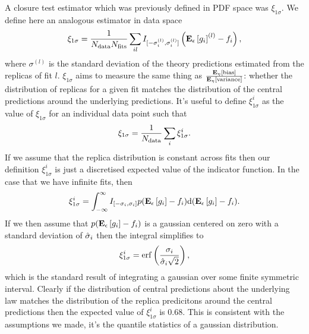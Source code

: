 A closure test estimator which was previously defined in PDF space was $\xi_{1\sigma}$.
We define here an analogous estimator in data space
\begin{equation}
    \xi_{1\sigma} = \frac{1}{N_{\rm data} N_{\rm fits}} \sum_{il}
    I_{[-\sigma_i^{(l)}, \sigma_i^{(l)}]}
    \left( \mathbf{E}_{\epsilon}\left[ g_i \right]^{(l)} - f_i \right),
\end{equation}
where $\sigma^{(l)}$ is the standard deviation of the theory predictions
estimated from the replicas of fit $l$. $\xi_{1\sigma}$ aims to measure the same
thing as $\frac{\mathbf{E}_{\eta}\left[ {\rm bias} \right]}{\mathbf{E}_{\eta}\left[ {\rm variance} \right]}$: whether the distribution of
replicas for a given fit matches the distribution of the central predictions
around the underlying predictions. It's useful to define $\xi_{1\sigma}^{i}$ as
the value of $\xi_{1\sigma}$ for an individual data point
such that
\begin{equation}
    \xi_{1\sigma} = \frac{1}{N_{\rm data}} \sum_i \xi_{1\sigma}^{i}.
\end{equation}
If we assume that
the replica distribution is constant across
fits then our definition $\xi_{1\sigma}^{i}$ is just a discretised expected value
of the indicator function. In the case that we have infinite fits, then
\begin{equation}
    \xi_{1\sigma}^{i} = \int_{-\infty}^{\infty} I_{[-\sigma_i, \sigma_i]}
    p(\mathbf{E}_{\epsilon}\left[ g_i \right] - f_i)
    {\rm d}(\mathbf{E}_{\epsilon}\left[ g_i \right] - f_i).
\end{equation}
If we then assume that $p(\mathbf{E}_{\epsilon}\left[ g_i \right] - f_i)$ is a gaussian centered on zero
with a standard deviation of $\hat{\sigma}_i$ then the integral simplifies to
\begin{equation}
    \xi_{1\sigma}^{i} = {\rm erf} \left( \frac{\sigma_i}{\hat{\sigma}_i \sqrt{2}}\right),
    \label{eq:expectedxi}
\end{equation}
which is the standard result of integrating a gaussian over some finite symmetric
interval. Clearly if the distribution of central predictions about the underlying law
matches the distribution of the replica predicitons around the central predictions
then the expected value of $\xi_{1\sigma}^{i}$ is 0.68. This is consistent with
the assumptions we made, it's the quantile statistics of a gaussian distribution.

